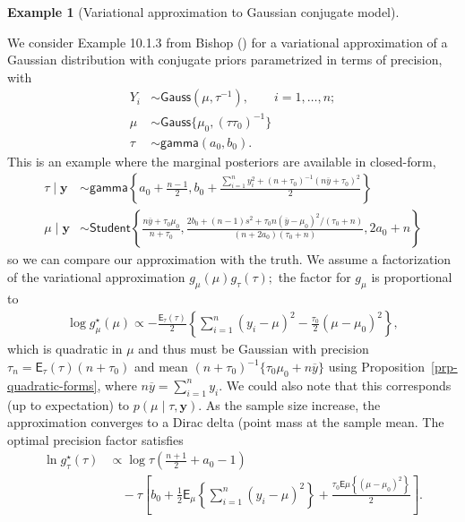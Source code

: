 \documentclass[
  11pt,
  letterpaper,
]{scrbook}
\theoremstyle{plain}
\theoremstyle{plain}
\theoremstyle{definition}
\theoremstyle{definition}
\theoremstyle{definition}
\newtheorem{example}{Example}[chapter]
\theoremstyle{plain}
\theoremstyle{remark}
\begin{document}
\begin{example}[Variational approximation to Gaussian conjugate
model]\protect\hypertarget{exm-gaussian-variational-approx}{}\label{exm-gaussian-variational-approx}

We consider Example 10.1.3 from Bishop
() for a variational approximation of a
Gaussian distribution with conjugate priors parametrized in terms of
precision, with \begin{align*}
Y_i &\sim \mathsf{Gauss}(\mu, \tau^{-1}), \qquad i =1, \ldots, n;\\
\mu &\sim \mathsf{Gauss}\{\mu_0, (\tau\tau_0)^{-1}\} \\
\tau &\sim \mathsf{gamma}(a_0, b_0).
\end{align*} This is an example where the marginal posteriors are
available in closed-form, \begin{align*}
\tau \mid \boldsymbol{y} &\sim \mathsf{gamma}\left\{ a_0 + \frac{n-1}{2}, b_0 + \frac{\sum_{i=1}^n y_i^2 + (n+\tau_0)^{-1}(n\overline{y}+\tau_0)^2}{2}\right\} 
\\ \mu \mid \boldsymbol{y} &\sim \mathsf{Student}\left\{ \frac{n\overline{y}+\tau_0\mu_0}{n+\tau_0}, \frac{2b_0 +(n-1)s^2 + \tau_0n(\overline{y}-\mu_0)^2/(\tau_0+n)}{(n+2a_0)(\tau_0+n)}, 2a_0+n\right\}
\end{align*} so we can compare our approximation with the truth. We
assume a factorization of the variational approximation
\(g_\mu(\mu)g_\tau(\tau);\) the factor for \(g_\mu\) is proportional to
\begin{align*}
 \log g^{\star}_{\mu}(\mu) \propto -\frac{\mathsf{E}_{\tau}(\tau)}{2} \left\{ \sum_{i=1}^n (y_i-\mu)^2-\frac{\tau_0}{2}(\mu-\mu_0)^2\right\},
\end{align*} which is quadratic in \(\mu\) and thus must be Gaussian
with precision \(\tau_n = \mathsf{E}_{\tau}(\tau)(n + \tau_0)\) and mean
\((n + \tau_0)^{-1}\{\tau_0\mu_0 + n\overline{y}\}\) using
Proposition~\ref{prp-quadratic-forms}, where
\(n\overline{y} = \sum_{i=1}^n y_i.\) We could also note that this
corresponds (up to expectation) to \(p(\mu \mid \tau, \boldsymbol{y}).\)
As the sample size increase, the approximation converges to a Dirac
delta (point mass at the sample mean. The optimal precision factor
satisfies \begin{align*}
 \ln g^{\star}_{\tau}(\tau) &\propto \log \tau\left(\frac{n+1}{2} + a_0-1\right)   \\&\quad- \tau \left[b_0  + \frac{1}{2} \mathsf{E}_{\mu}\left\{\sum_{i=1}^n (y_i-\mu)^2\right\} + \frac{\tau_0\mathsf{E}{\mu}\left\{(\mu-\mu_0)^2\right\}}{2}\right].

\end{align*}
\end{example}
\end{document}

